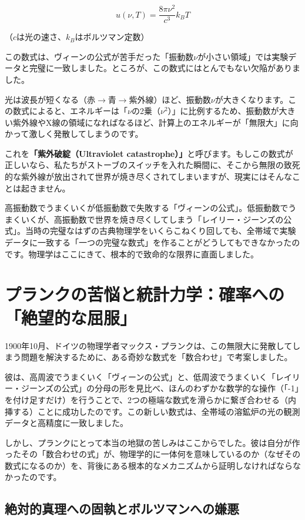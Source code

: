 \[u(\nu, T) = \frac{8\pi \nu^2}{c^3} k_B T\]

（\(c\)は光の速さ、\(k_B\)はボルツマン定数）

この数式は、ヴィーンの公式が苦手だった「振動数\(\nu\)が小さい領域」では実験データと完璧に一致しました。ところが、この数式にはとんでもない欠陥がありました。

光は波長が短くなる（赤\(\rightarrow\)青\(\rightarrow\)紫外線）ほど、振動数\(\nu\)が大きくなります。この数式によると、エネルギーは「\(\nu\)の2乗（\(\nu^2\)）」に比例するため、振動数が大きい紫外線やX線の領域になればなるほど、計算上のエネルギーが「無限大」に向かって激しく発散してしまうのです。

これを\textbf{「紫外破綻（Ultraviolet catastrophe）」}と呼びます。もしこの数式が正しいなら、私たちがストーブのスイッチを入れた瞬間に、そこから無限の致死的な紫外線が放出されて世界が焼き尽くされてしまいますが、現実にはそんなことは起きません。

高振動数でうまくいくが低振動数で失敗する「ヴィーンの公式」。低振動数でうまくいくが、高振動数で世界を焼き尽くしてしまう「レイリー・ジーンズの公式」。当時の完璧なはずの古典物理学をいくらこねくり回しても、全帯域で実験データに一致する「一つの完璧な数式」を作ることがどうしてもできなかったのです。物理学はここにきて、根本的で致命的な限界に直面しました。

\section{プランクの苦悩と統計力学：確率への「絶望的な屈服」}

1900年10月、ドイツの物理学者マックス・プランクは、この無限大に発散してしまう問題を解決するために、ある奇妙な数式を「数合わせ」で考案しました。

彼は、高周波でうまくいく「ヴィーンの公式」と、低周波でうまくいく「レイリー・ジーンズの公式」の分母の形を見比べ、ほんのわずかな数学的な操作（「-1」を付け足すだけ）を行うことで、2つの極端な数式を滑らかに繋ぎ合わせる（内挿する）ことに成功したのです。この新しい数式は、全帯域の溶鉱炉の光の観測データと高精度に一致しました。

しかし、プランクにとって本当の地獄の苦しみはここからでした。彼は自分が作ったその「数合わせの式」が、物理学的に一体何を意味しているのか（なぜその数式になるのか）を、背後にある根本的なメカニズムから証明しなければならなかったのです。

\subsection{絶対的真理への固執とボルツマンへの嫌悪}

